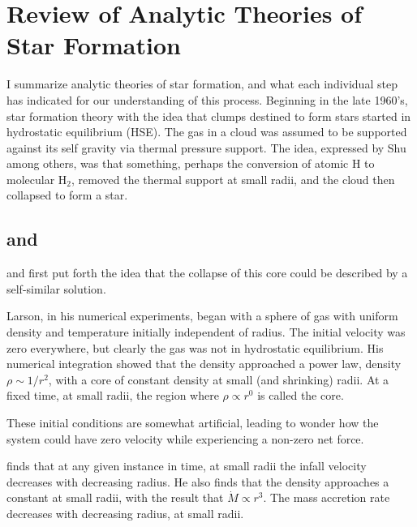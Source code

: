\documentclass[../dissertation.tex]{subfiles}
\begin{document}
\section{Review of Analytic Theories of Star Formation} \label{sec:sf_review}
I summarize analytic theories of star formation, and what each individual step has indicated for our understanding of this process.
Beginning in the late 1960's, star formation theory with the idea that clumps destined to form stars started in hydrostatic equilibrium (HSE). The gas in a cloud was assumed to be supported against its self gravity via thermal pressure support. 
The idea, expressed by Shu among others, was that something, perhaps the conversion of atomic H to molecular H$_2$, removed the thermal support at small radii, and the cloud then collapsed to form a star.

\subsection{\citet{1969MNRAS.145..271L} and \citet{1969MNRAS.144..425P}}
\citet{1969MNRAS.145..271L} and \citet{1969MNRAS.144..425P} first put forth the idea that the collapse of this core could be described by a self-similar solution. 

Larson, in his numerical experiments, began with a sphere of gas with  uniform density and temperature initially independent of radius. 
The initial velocity was zero everywhere, but clearly the gas was not in hydrostatic equilibrium. His numerical integration showed that the density approached a power law, density $\rho\sim 1/r^2$, with a core of constant density at small (and shrinking) radii. At a fixed time, at small radii, the region where $\rho \propto r^0$ is called the core. 

These initial conditions are somewhat artificial, leading \citet{1977ApJ...214..488S} to wonder how the system could have zero velocity while experiencing a non-zero net force.



\citet{1969MNRAS.145..271L} finds that at any given instance in time, at small radii the infall velocity decreases with decreasing radius.
He also finds that the density approaches a constant at small radii, with the result that $\dot{M} \propto r^3 $. 
The mass accretion rate decreases with decreasing radius, at small radii.
\end{document}
